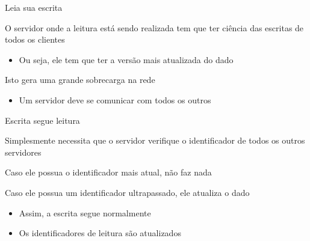 \documentclass[compress]{beamer}
\begin{document}

\begin{frame}{Leia sua escrita}

O servidor onde a leitura está sendo realizada tem que ter ciência das escritas de todos os clientes
\begin{itemize}
    \item Ou seja, ele tem que ter a versão mais atualizada do dado
\end{itemize}
    
\vspace{0.5cm}

Isto gera uma grande sobrecarga na rede
\begin{itemize}
    \item Um servidor deve se comunicar com todos os outros
\end{itemize}

\end{frame}


\begin{frame}{Escrita segue leitura}

Simplesmente necessita que o servidor verifique o identificador de todos os outros servidores

\vspace{0.5cm}

Caso ele possua o identificador mais atual, não faz nada

\vspace{0.5cm}

Caso ele possua um identificador ultrapassado, ele atualiza o dado
\begin{itemize}
    \item Assim, a escrita segue normalmente
    \item Os identificadores de leitura são atualizados
\end{itemize}

\end{frame}
\end{document}
